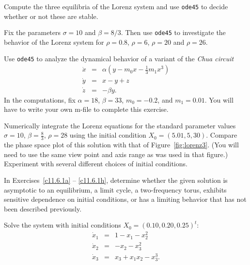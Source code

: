 \EXER

\CEXER



\begin{exercise} \label{c11.4.1}
Compute the three equilibria of the Lorenz system 
and use {\tt ode45} to decide whether or not these are stable.
\end{exercise}

\begin{exercise} \label{c11.4.2}
Fix the parameters $\sigma=10$ and $\beta = 8/3$.  Then
use {\tt ode45} to investigate the behavior of the Lorenz system
 for $\rho=0.8$, $\rho=6$, $\rho=20$ and $\rho=26$.
\end{exercise}

\begin{exercise} \label{c11.4.3}
Use {\tt ode45} to analyze the dynamical behavior of a variant of the 
{\em Chua circuit}
\begin{eqnarray*}
  \dot{x} &=& \alpha\left(y-m_0x-\frac{1}{3}m_1x^3\right) \\
  \dot{y} &=& x-y+z \\
  \dot{z} &=& - \beta y.
\end{eqnarray*}
In the computations, fix $\alpha=18$, $\beta=33$, $m_0=-0.2$, and $m_1=0.01$.
You will have to write your own m-file to complete this exercise. 
\end{exercise}

\begin{exercise} \label{c11.4.3a}
Numerically integrate the Lorenz equations  for the standard 
parameter values $\sigma=10$, $\beta=\frac{8}{3}$, $\rho=28$ using the initial 
condition $X_0 =(5.01,5,30)$.  Compare the phase space plot of this solution 
with that of Figure~\ref{fig:lorenz3}.  (You will need to use the same view
point and axis range as was used in that figure.)  Experiment with several 
different choices of initial conditions.
\end{exercise}


\noindent In Exercises~\ref{c11.6.1a} -- \ref{c11.6.1h}, determine whether the 
given solution is asymptotic to an equilibrium, a limit cycle, a two-frequency 
torus, exhibits sensitive dependence on initial conditions, or has a limiting 
behavior that has not been described previously.

\begin{exercise}  \label{c11.6.1a}
Solve the system  with initial conditions 
$X_0 = (0.10, 0.20, 0.25)^t$:
\begin{equation*} \label{e11.6.1a}
\begin{array}{rcl} 
\dot{x}_1 & = & 1 - x_1 - x_2^2 \\
\dot{x}_2 & = & -x_2-x_3^2   \\
\dot{x}_3 & = & x_3 +x_1x_2-x_3^3.   \end{array} 
\end{equation*}
\end{exercise}

